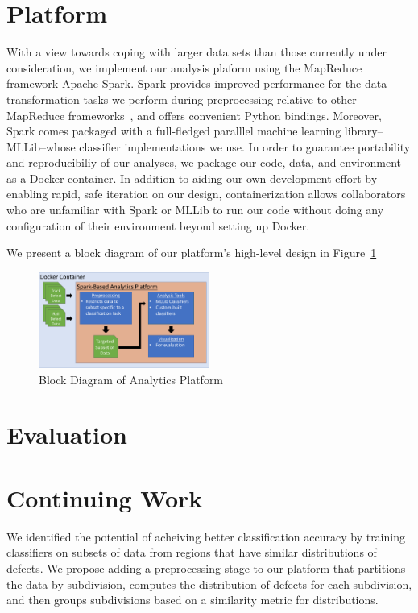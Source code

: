 \documentclass{sig-alternate-05-2015}
\begin{document}
\section{Platform}
With a view towards coping with larger data sets than those currently under consideration, we
implement our analysis plaform using the MapReduce framework Apache Spark. Spark provides 
improved performance for the data transformation tasks we perform during preprocessing relative
to other MapReduce frameworks~\cite{Zaharia:2012}, and offers convenient Python bindings. Moreover, Spark comes 
packaged with a full-fledged paralllel machine learning library--MLLib--whose classifier 
implementations we use.
In order to guarantee portability and reproducibiliy of our analyses, we package our code,
data, and environment as a Docker container. In addition to aiding our own development effort
by enabling rapid, safe iteration on our design, containerization allows collaborators who are
unfamiliar with Spark or MLLib to run our code without doing any configuration of their 
environment beyond setting up Docker. 

We present a block diagram of our platform's high-level design in Figure~\ref{fig_block_diagram}
\begin{figure}[ht!]
\includegraphics[width=0.50\textwidth]{block_diagram.pdf}
\caption{Block Diagram of Analytics Platform}
\label{fig_block_diagram}
\end{figure}

\section{Evaluation}

\section{Continuing Work}
We identified the potential of acheiving better classification accuracy by training 
classifiers on subsets of data from regions that have similar distributions of defects.
We propose adding a preprocessing stage to our platform that partitions the data by 
subdivision, computes the distribution of defects for each subdivision, and then groups
subdivisions based on a similarity metric for distributions. 
\end{document}
